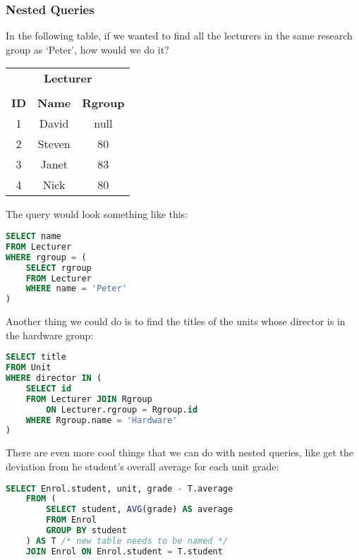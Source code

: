 \documentclass[11pt,a4paper,titlepage,dvipsnames,cmyk]{scrartcl}
\begin{document}
\subsubsection{Nested Queries}%
\label{ssub:nested-queries}
In the following table, if we wanted to find all the lecturers in the same
research group as `Peter', how would we do it?

\begin{center}
    \begin{tabular}{|c|c|c|}
        \multicolumn{3}{c}{\textbf{Lecturer}} \\
        \multicolumn{3}{c}{} \\ \hline
        \textbf{ID} & \textbf{Name} & \textbf{Rgroup} \\ \hhline{|=|=|=|}
        1 & David & null \\ \hline
        2 & Steven & 80 \\ \hline
        3 & Janet & 83 \\ \hline
        4 & Nick & 80 \\ \hline
    \end{tabular}
\end{center}

The query would look something like this:

\begin{lstlisting}[language=SQL]
SELECT name
FROM Lecturer
WHERE rgroup = (
    SELECT rgroup
    FROM Lecturer
    WHERE name = 'Peter'
)
\end{lstlisting}

Another thing we could do is to find the titles of the units whose
director is in the hardware group:

\begin{lstlisting}[language=SQL]
SELECT title
FROM Unit
WHERE director IN (
    SELECT id
    FROM Lecturer JOIN Rgroup
        ON Lecturer.rgroup = Rgroup.id
    WHERE Rgroup.name = 'Hardware'
)
\end{lstlisting}

There are even more cool things that we can do with nested queries, like
get the deviation from he student's overall average for each unit grade:

\begin{lstlisting}[language=SQL]
SELECT Enrol.student, unit, grade - T.average
    FROM (
        SELECT student, AVG(grade) AS average
        FROM Enrol
        GROUP BY student
    ) AS T /* new table needs to be named */
    JOIN Enrol ON Enrol.student = T.student
\end{lstlisting}
\end{document}

